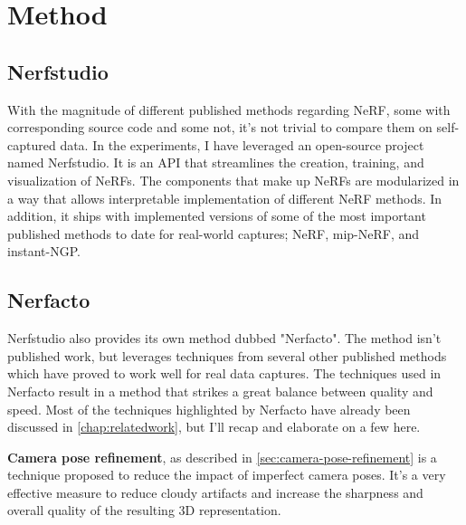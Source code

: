 \chapter{Method}

\begin{comment}
Describe the pipeline used to generate NeRFs

- Capture (video, image, polycam, etc.)
- Process (COLMAP, or direct extraction from e.g. Polycam)
    - Configuration of COLMAP
- Train (Different models)
    - Configuration of model
- Render (Real-time rendering vs. slow rendering)
- Evaluate (PSNR, SSIM, LPIPS)
- Export

- Pipelines created
    - Pipeline to test 
\end{comment}

\section{Nerfstudio}
With the magnitude of different published methods regarding NeRF, some with corresponding source code and some not, it's not trivial to compare them on self-captured data. In the experiments, I have leveraged an open-source project named Nerfstudio. It is an API that streamlines the creation, training, and visualization of NeRFs. The components that make up NeRFs are modularized in a way that allows interpretable implementation of different NeRF methods. In addition, it ships with implemented versions of some of the most important published methods to date for real-world captures; NeRF, mip-NeRF, and instant-NGP.

\section{Nerfacto}
Nerfstudio also provides its own method dubbed "Nerfacto". The method isn't published work, but leverages techniques from several other published methods which have proved to work well for real data captures. The techniques used in Nerfacto result in a method that strikes a great balance between quality and speed. Most of the techniques highlighted by Nerfacto have already been discussed in \autoref{chap:relatedwork}, but I'll recap and elaborate on a few here.

\textbf{Camera pose refinement}, as described in \autoref{sec:camera-pose-refinement} is a technique proposed to reduce the impact of imperfect camera poses. It's a very effective measure to reduce cloudy artifacts and increase the sharpness and overall quality of the resulting 3D representation.

